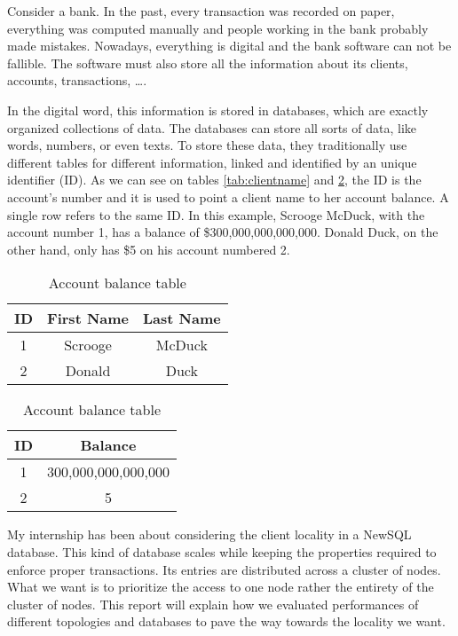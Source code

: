 Consider a bank. In the past, every transaction was recorded on paper, everything was computed manually and people working in the bank probably made mistakes. Nowadays, everything is digital and the bank software can not be fallible. The software must also store all the information about its clients, accounts, transactions, \dots.

In the digital word, this information is stored in databases, which are exactly organized collections of data. The databases can store all sorts of data, like words, numbers, or even texts. To store these data, they traditionally use different tables for different information, linked and identified by an unique identifier (ID). As we can see on tables \ref{tab:clientname} and \ref{tab:accountbalance}, the ID is the account's number and it is used to point a client name to her account balance. A single row refers to the same ID. In this example, Scrooge McDuck, with the account number 1, has a balance of \$300,000,000,000,000. Donald Duck, on the other hand, only has \$5 on his account numbered 2.
\begin{table}[H]
  \begin{minipage}[b]{0.45\linewidth}\centering
\begin{tabular}{|c|c|c|}
\hline
ID & First Name & Last Name \\
\hline
1 & Scrooge & McDuck \\
2 & Donald & Duck \\
\hline
\end{tabular}
\caption{Client name table}
\label{tab:clientname}
  \end{minipage}
\begin{minipage}[b]{0.45\linewidth}\centering

\begin{tabular}{|c|c|}
\hline
ID & Balance \\
\hline
1 & 300,000,000,000,000 \\
2 & 5 \\
\hline
\end{tabular}
\caption{Account balance table}
\label{tab:accountbalance}
\end{minipage}
\end{table}


My internship has been about considering the client locality in a NewSQL database. This kind of database scales while keeping the properties required to enforce proper transactions. Its entries are distributed across a cluster of nodes. What we want is to prioritize the access to one node rather the entirety of the cluster of nodes. This report will explain how we evaluated performances of different topologies and databases to pave the way towards the locality we want.

